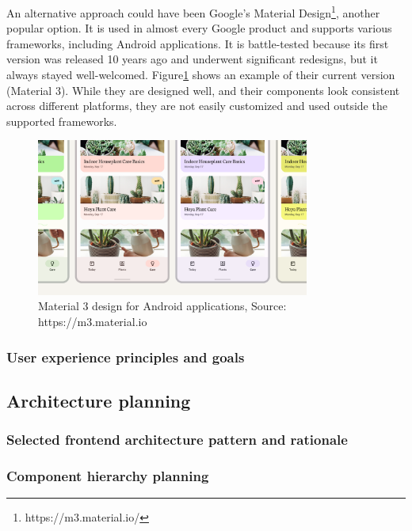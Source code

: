 An alternative approach could have been Google's Material Design\footnote{https://m3.material.io/}, another popular option. It is used in almost every Google product and supports various frameworks, including Android applications. It is battle-tested because its first version was released 10 years ago and underwent significant redesigns, but it always stayed well-welcomed. Figure\ref{fig:material3} shows an example of their current version (Material 3). While they are designed well, and their components look consistent across different platforms, they are not easily customized and used outside the supported frameworks.

\begin{figure}[H]
    \centering
    \includegraphics[width=0.8\textwidth, keepaspectratio]{figures/material3.png}
    \caption{Material 3 design for Android applications, Source: https://m3.material.io}
    \label{fig:material3}
\end{figure}

\subsubsection{User experience principles and goals}

\subsection{Architecture planning}

\subsubsection{Selected frontend architecture pattern and rationale}

\subsubsection{Component hierarchy planning}

